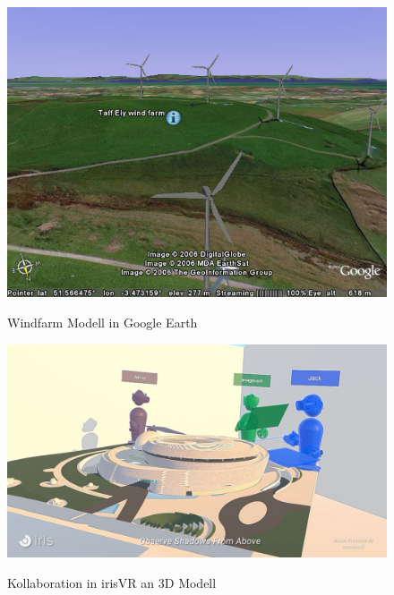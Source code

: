 \begin{figure}[h]
	\begin{center}
		\noindent\includegraphics[scale=0.6]{Resources/Hintergrund/Windfarm.jpg}
		\label{windfarm}
		\caption{Windfarm Modell in Google Earth}	
	\end{center}
\end{figure}

\begin{figure}[h]
	\begin{center}
		\noindent\includegraphics[scale=0.2]{Resources/Hintergrund/irisVR.jpg}
		\label{irisVR}
		\caption{Kollaboration in irisVR an 3D Modell}	
	\end{center}
\end{figure}

